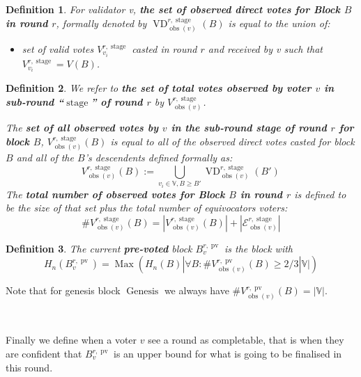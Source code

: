 \documentclass{article}
\newcommand{\assign}{:=}
\newcommand{\nosymbol}{}
\newcommand{\tmop}[1]{\ensuremath{\operatorname{#1}}}
\newcommand{\tmstrong}[1]{\textbf{#1}}
\newcommand{\tmtextbf}[1]{{\bfseries{#1}}}
\newenvironment{itemizedot}{\begin{itemize} \renewcommand{\labelitemi}{$\bullet$}\renewcommand{\labelitemii}{$\bullet$}\renewcommand{\labelitemiii}{$\bullet$}\renewcommand{\labelitemiv}{$\bullet$}}{\end{itemize}}
\newtheorem{definition}{Definition}
\providecommand{\nosymbol}{}
\providecommand{\tmop}[1]{\ensuremath{\mathrm{#1}}}
\providecommand{\tmstrong}[1]{\tmtextbf{#1}}
\providecommand{\tmtextbf}[1]{\tmtextbf{#1}}
\newtheorem{definition}{Definition}
\begin{document}
\begin{definition}
  For validator v, {\tmstrong{the set of observed direct votes for Block $B$
  in round $r$}}, formally denoted by $\tmop{VD}^{r, \tmop{stage}}_{\tmop{obs}
  (v)}^{\nosymbol}_{\nosymbol} (B)$ is equal to the union of:
  \begin{itemizedot}
    \item set of valid votes $V^{r, \tmop{stage}}_{v_i}$ casted in round $r$
    and received by v such that $V^{r, \tmop{stage}}_{v_i} = V (B)$.
  \end{itemizedot}
\end{definition}

\begin{definition}
  We refer to {\tmstrong{the set of total votes observed by voter $v$ in
  sub-round ``$\tmop{stage}$'' of round $r$}} by {\tmstrong{$V^{r,
  \tmop{stage}}_{\tmop{obs} (v)}^{\nosymbol}_{\nosymbol}$}}.
  
  The {\tmstrong{set of all observed votes by $v$ in the sub-round stage of
  round $r$ for block $B$}}, {\tmstrong{$V^{r, \tmop{stage}}_{\tmop{obs} (v)}
  (B)$}} is equal to all of the observed direct votes casted for block $B$ and
  all of the $B$'s descendents defined formally as:
  \[ V^{r, \tmop{stage}}_{\tmop{obs} (v)} (B) \assign \bigcup_{v_i \in
     \mathbb{V}, B \geqslant B'} \tmop{VD}^{r, \tmop{stage}}_{\tmop{obs} (v)}
     (B')_{\nosymbol}^{\nosymbol}_{\nosymbol} \]
  The {\tmstrong{total number of observed votes for Block $B$ in round $r$}}
  is defined to be the size of that set plus the total number of equivocators
  voters:
  \[ \#V^{r, \tmop{stage}}_{\tmop{obs} (v)} (B) = |V^{r,
     \tmop{stage}}_{\tmop{obs} (v)} (B) | + |\mathcal{E}^{r,
     \tmop{stage}}_{\tmop{obs} (v)} | \]
\end{definition}

\begin{definition}
  The current {\tmstrong{pre-voted}} block $B^{r, \tmop{pv}}_v$ is the block
  with
  \[ H_n (B^{r, \tmop{pv}}_v) = \tmop{Max} (H_n (B) | \forall B :
     \#V_{\tmop{obs} (v)}^{r, \tmop{pv}} (B) \geqslant 2 / 3|\mathbb{V}|) \]
\end{definition}

Note that for genesis block $\tmop{Genesis}$ we always have $\#V_{\tmop{obs}
(v)}^{r, \tmop{pv}} (B) = |\mathbb{V}|$.

\

Finally we define when a voter $v$ see a round as completable, that is when
they are confident that $B_v^{r, \tmop{pv}}$ is an upper bound for what is
going to be finalised in this round.
\end{document}
